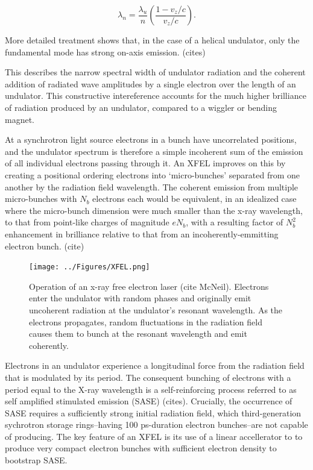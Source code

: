 \documentclass [11pt, proquest, article] {uwthesis}[2016/11/22]
\begin{document}
\begin{equation}
\lambda_n = \frac{\lambda_u}{n}(\frac{1 - v_z/c}{v_z/c}).
\end{equation}

More detailed treatment shows that, in the case of a helical undulator, only the fundamental mode has strong on-axis emission. (cites)

This describes the narrow spectral width of undulator radiation and the coherent addition of radiated wave amplitudes by a single electron over the length of an undulator. This constructive intereference accounts for the much higher brilliance of radiation produced by an undulator, compared to a wiggler or bending magnet. 

At a synchrotron light source electrons in a bunch have uncorrelated positions, and the undulator spectrum is therefore a simple incoherent sum of the emission of all individual electrons passing through it. An XFEL improves on this by creating a positional ordering electrons into `micro-bunches' separated from one another by the radiation field wavelength. The coherent emission from multiple micro-bunches with $N_b$ electrons each would be equivalent, in an idealized case where the micro-bunch dimension were much smaller than the x-ray wavelength, to that from point-like charges of magnitude $e N_b$, with a resulting factor of $N_b^2$ enhancement in brilliance relative to that from an incoherently-emmitting electron bunch. (cite)


\begin{figure}[h] 
\caption{Operation of an x-ray free electron laser (cite McNeil). Electrons enter the undulator with random phases and originally emit uncoherent radiation at the undulator's resonant wavelength. As the electrons propagates, random fluctuations in the radiation field causes them to bunch at the resonant wavelength and emit coherently.}
\centering
\texttt{[image: ../Figures/XFEL.png]}
\label{fig:xfel}
\end{figure}

Electrons in an undulator experience a longitudinal force from the radiation field that is modulated by its period. The consequent bunching of electrons with a period equal to the X-ray wavelength is a self-reinforcing process referred to as self amplified stimulated emission (SASE) (cites). Crucially, the occurrence of SASE requires a sufficiently strong initial radiation field, which third-generation sychrotron storage rings--having 100 ps-duration electron bunches--are not capable of producing. The key feature of an XFEL is its use of a linear accellerator to to produce very compact electron bunches with sufficient electron density to bootstrap SASE.
\end{document}
